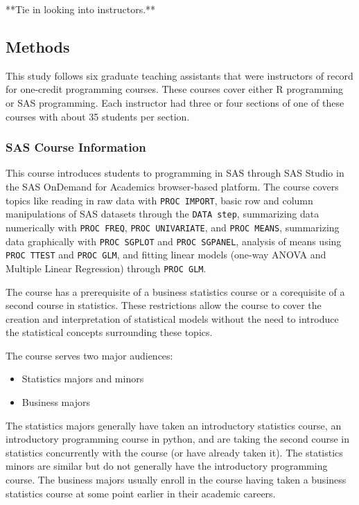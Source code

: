 \documentclass[
  letterpaper,
  DIV=11,
  numbers=noendperiod]{scrartcl}
\providecommand{\tightlist}{%
  \setlength{\itemsep}{0pt}\setlength{\parskip}{0pt}}\usepackage{longtable,booktabs,array}
\begin{document}
**Tie in looking into instructors.**

\hypertarget{methods}{%
\subsection{Methods}\label{methods}}

This study follows six graduate teaching assistants that were
instructors of record for one-credit programming courses. These courses
cover either R programming or SAS programming. Each instructor had three
or four sections of one of these courses with about 35 students per
section.

\hypertarget{sas-course-information}{%
\subsubsection{SAS Course Information}\label{sas-course-information}}

This course introduces students to programming in SAS through SAS Studio
in the SAS OnDemand for Academics browser-based platform. The course
covers topics like reading in raw data with \texttt{PROC\ IMPORT}, basic
row and column manipulations of SAS datasets through the
\texttt{DATA\ step}, summarizing data numerically with
\texttt{PROC\ FREQ}, \texttt{PROC\ UNIVARIATE}, and
\texttt{PROC\ MEANS}, summarizing data graphically with
\texttt{PROC\ SGPLOT} and \texttt{PROC\ SGPANEL}, analysis of means
using \texttt{PROC\ TTEST} and \texttt{PROC\ GLM}, and fitting linear
models (one-way ANOVA and Multiple Linear Regression) through
\texttt{PROC\ GLM}.

The course has a prerequisite of a business statistics course or a
corequisite of a second course in statistics. These restrictions allow
the course to cover the creation and interpretation of statistical
models without the need to introduce the statistical concepts
surrounding these topics.

The course serves two major audiences:

\begin{itemize}
\tightlist
\item
  Statistics majors and minors
\item
  Business majors
\end{itemize}

The statistics majors generally have taken an introductory statistics
course, an introductory programming course in python, and are taking the
second course in statistics concurrently with the course (or have
already taken it). The statistics minors are similar but do not
generally have the introductory programming course. The business majors
usually enroll in the course having taken a business statistics course
at some point earlier in their academic careers.
\end{document}
